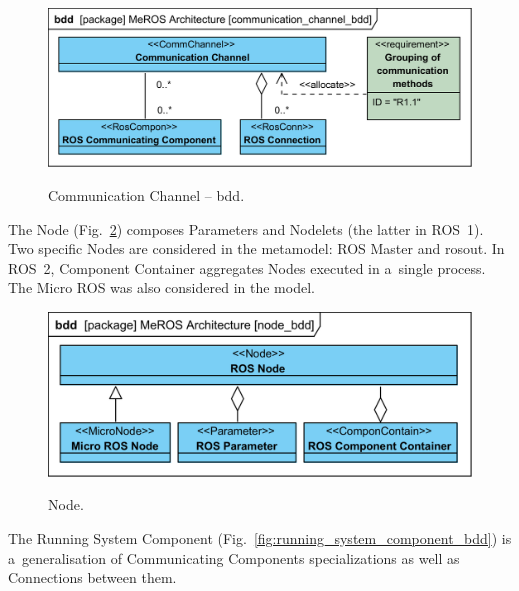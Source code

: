 \documentclass[11pt,oneside,a4paper]{report}
\begin{document}
	\begin{figure}[H]
		\centering
		\begin{center}
			{\includegraphics[scale=1.0]{diagrams/communication_channel_bdd.png}}
		\end{center}
		\caption{Communication Channel -- bdd.} 
		\label{fig:communication_channel_bdd}
	\end{figure}
	

	\pagebreak
		 
 	The Node (Fig.~\ref{fig:node_bdd}) composes Parameters and Nodelets (the latter in ROS~1). Two specific Nodes are considered in the metamodel: ROS Master and rosout. In ROS~2, Component Container aggregates Nodes executed in a~single process. The Micro ROS was also considered in the model. 
 	

	 
 	\begin{figure}[H]
	 	\centering
	 	\begin{center}
	 		{\includegraphics[scale=1.0]{diagrams/node_bdd.png}}
	 	\end{center}
	 	\caption{Node.} 
		 	\label{fig:node_bdd}
	 \end{figure}
	 
	The Running System Component (Fig.~\ref{fig:running_system_component_bdd}) is a~generalisation of Communicating Components specializations as well as Connections between them.
	
\end{document}
